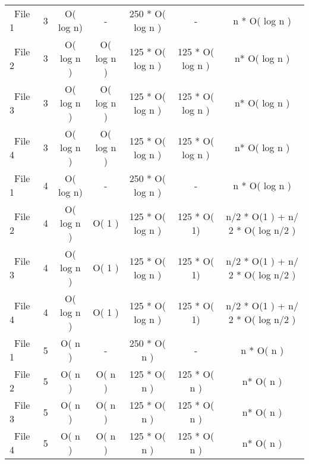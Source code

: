 \documentclass[8]{report}
\begin{document}
\begin{table}[ht]
\begin{adjustbox}{width=1.35\textwidth}
\begin{threeparttable}
\begin{tabular}{l*{6}{c}}
 

\ File 1 	&      3   &     O( log n)  &    -  		&   250 * O( log n )    &  -   &  n * O( log n )   \\
                       

\ File 2 	&      3     &      O( log n )   &   O( log n ) 	&    125 * O( log n )   &   125 *  O( log n )     & n* O( log n  )  \\
                  
\ File 3 	&      3     &      O( log n )   &   O( log n ) 	&    125 * O( log n )   &   125 *  O( log n )     & n* O( log n  )  \\ 
 \ File 4 	&      3     &      O( log n )   &   O( log n ) 	&    125 * O( log n )   &   125 *  O( log n )     & n* O( log n  )  \\ 

 
 
 
\ File 1 	&      4   &     O( log n)  &    -  		&   250 * O( log n )    &  -   &  n * O( log n )   \\
                       

\ File 2 	&      4     &      O( log n )   &   O( 1 ) 	&    125 * O( log n )   &   125 *  O( 1)     & n/2 * O(1 ) +  n/ 2 * O( log n/2  )  \\
                  
\ File 3 	&      4     &      O( log n )   &   O( 1 ) 	&    125 * O( log n )   &   125 *  O( 1)     & n/2 * O(1 ) +  n/ 2 * O( log n/2  )  \\
 \ File 4 	&      4     &      O( log n )   &   O( 1 ) 	&    125 * O( log n )   &   125 *  O( 1)     & n/2 * O(1 ) +  n/ 2 * O( log n/2  )  \\
 
 
 
 
\ File 1 	&      5    &     O( n )  &    -  		&   250 * O( n )    &  -   &  n * O( n )   \\
                       

\ File 2 	&      5     &      O(  n )   &   O( n ) 	&    125 * O(  n )   &   125 *  O( n )     & n* O(  n  )  \\
                  
\ File 3 	&      5     &      O(  n )   &   O(  n ) 	&    125 * O(  n )   &   125 *  O(  n )     & n* O( n  )  \\ 
 \ File 4 	&      5     &      O( n )   &   O( n ) 	&    125 * O( n )   &   125 *  O( n )     & n* O( n  )  \\ 
 
 
 

\end{tabular}
\end{threeparttable}
\end{adjustbox}
\end{table}
\end{document}
